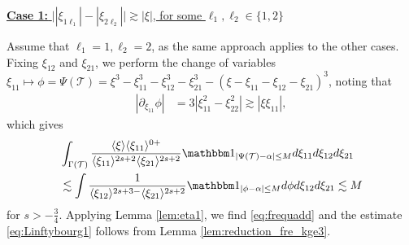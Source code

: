 \documentclass[%
11pt,  reqno]{amsart}
\newcommand{\5}{\textup{V}}
\newcommand{\noi}{\noindent}
\newcommand{\ind}{\mathbbm 1}
\newcommand{\les}{\lesssim}
\newcommand{\wt}{\widetilde}
\theoremstyle{remark}
\newcommand{\TT}{\mathcal{T}}
\newcommand{\al}{\alpha}
\newcommand{\G}{\Gamma}
\renewcommand{\l}{\ell}
\newcommand{\ges}{\gtrsim}
\newcommand{\jb}[1]
{\langle #1 \rangle}
\numberwithin{equation}{section}
\numberwithin{theorem}{section}
\begin{document}
\smallskip
\noi
\underline{\textbf{Case 1:} $\big||\xi_{1 \l_1}|-|\xi_{2\l_2}|\big| \ges |\xi|$, for some $\l_1,\l_2\in\{1,2\}$}

Assume that $\l_1 = 1,\l_2=2$, as the same approach applies to the other cases. 
Fixing $\xi_{12}$ and $\xi_{21}$, we perform the change of variables $\xi_{11} \mapsto \phi = \Psi(\TT) = \xi^3 - \xi_{11}^3 - \xi_{12}^3 - \xi_{21}^3 - (\xi-\xi_{11}-\xi_{12}-\xi_{21})^3$, noting that
\begin{align}\label{CV1}
|\partial_{\xi_{11}} \phi |
& = 3|\xi_{11}^2-\xi_{22}^2| \gtrsim |\xi \xi_{11}|,
\end{align}
which gives
\begin{align}
& 
\int_{\G(\TT)}
\frac{\jb{\xi} \jb{\xi_{11}}^{0+}  }{\jb{\xi_{11}}^{2s+2} \jb{\xi_{21}}^{2s+2} } \ind_{| \Psi(\TT) - \al | \le M} d\xi_{11} d\xi_{12} d\xi_{21}
\\
&
\les \int \frac{1}{\jb{\xi_{12}}^{2s+3-} \jb{\xi_{21}}^{2s+2}} \ind_{| \phi - \al  | \le M} d\phi d\xi_{12} d\xi_{21} 
\les M 
\end{align}
for $s>-\frac34$. Applying Lemma \ref{lem:eta1}, we find \eqref{eq:frequadd} and the estimate \eqref{eq:Linftybourg1} follows from Lemma \ref{lem:reduction_fre_kge3}.

\smallskip
\noi




\end{document}
